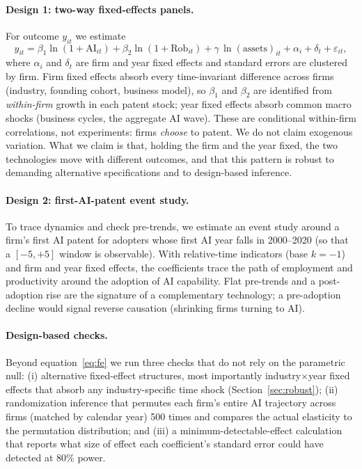\documentclass[12pt]{article}
\begin{document}
\paragraph{Design 1: two-way fixed-effects panels.} For outcome $y_{it}$ we estimate
\begin{equation}
y_{it} = \beta_{1}\ln(1+\text{AI}_{it}) + \beta_{2}\ln(1+\text{Rob}_{it})
         + \gamma\,\ln(\text{assets})_{it} + \alpha_i + \delta_t + \varepsilon_{it},
\label{eq:fe}
\end{equation}
where $\alpha_i$ and $\delta_t$ are firm and year fixed effects and standard errors are clustered
by firm. Firm fixed effects absorb every time-invariant difference across firms (industry,
founding cohort, business model), so $\beta_1$ and $\beta_2$ are identified from
\emph{within-firm} growth in each patent stock; year fixed effects absorb common macro shocks
(business cycles, the aggregate AI wave). These are conditional within-firm correlations, not
experiments: firms \emph{choose} to patent. We do not claim exogenous variation. What we claim is
that, holding the firm and the year fixed, the two technologies move with different outcomes, and
that this pattern is robust to demanding alternative specifications and to design-based inference.

\paragraph{Design 2: first-AI-patent event study.} To trace dynamics and check pre-trends, we
estimate an event study around a firm's first AI patent for adopters whose first AI year falls in
2000--2020 (so that a $[-5,+5]$ window is observable). With relative-time indicators (base
$k=-1$) and firm and year fixed effects, the coefficients trace the path of employment and
productivity around the adoption of AI capability. Flat pre-trends and a post-adoption rise are
the signature of a complementary technology; a pre-adoption decline would signal reverse
causation (shrinking firms turning to AI).

\paragraph{Design-based checks.} Beyond equation~\eqref{eq:fe} we run three checks that do not
rely on the parametric null: (i) alternative fixed-effect structures, most importantly
industry$\times$year fixed effects that absorb any industry-specific time shock
(Section~\ref{sec:robust}); (ii) randomization inference that permutes each firm's entire AI
trajectory across firms (matched by calendar year) 500 times and compares the actual elasticity to
the permutation distribution; and (iii) a minimum-detectable-effect calculation that reports what
size of effect each coefficient's standard error could have detected at 80\% power.
\end{document}
